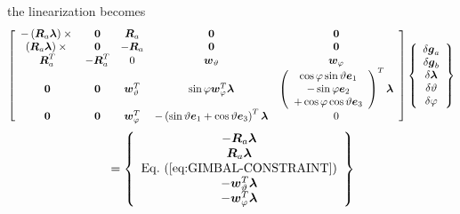 \documentclass[10pt,dvips,fleqn]{report}
\newcommand{\T}[1]{\boldsymbol{#1}}
\begin{document}
the linearization becomes
\begin{equation}
	\sqbr{\matr{ccccc}{
		-\plbr{\T{R}_a \T{\lambda}}\times{} & \T{0} & \T{R}_a & \T{0} & \T{0} \\
		\plbr{\T{R}_a \T{\lambda}}\times{} & \T{0} & -\T{R}_a & \T{0} & \T{0} \\
			\T{R}_a^T & -\T{R}_a^T & 0 & \T{w}_{\vartheta} & \T{w}_{\varphi} \\
		\T{0} & \T{0} & \T{w}_{\vartheta}^T &
			\sin\varphi\T{w}_{\varphi}^T \T{\lambda} &
			\plbr{\cvvect{
				\cos\varphi\sin\vartheta\T{e}_1 \\
				- \sin\varphi\T{e}_2 \\
				+ \cos\varphi\cos\vartheta\T{e}_3
			}}^T\T{\lambda} \\
		\T{0} & \T{0} & \T{w}_{\varphi}^T &
			-\plbr{\sin\vartheta\T{e}_1 + \cos\vartheta\T{e}_3}^T \T{\lambda} & 0
	}} \cubr{\cvvect{
		\delta\T{g}_a \\
		\delta\T{g}_b \\
		\delta\T{\lambda} \\
		\delta\vartheta \\
		\delta\varphi
	}}
\end{equation}
\begin{equation}
	\mbox{} = \cubr{\cvvect{
		-\T{R}_a \T{\lambda} \\
		\T{R}_a \T{\lambda} \\
		\mathrm{Eq.~(\ref{eq:GIMBAL-CONSTRAINT})} \\
		-\T{w}_{\vartheta}^T \T{\lambda} \\
		-\T{w}_{\varphi}^T \T{\lambda}
	}}
\end{equation}
\end{document}
